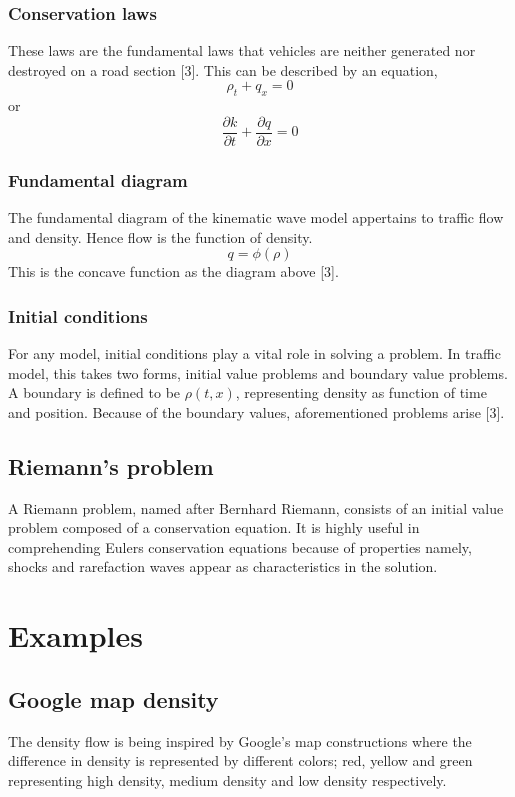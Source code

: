 \documentclass[12pt,a4paper]{report}
\begin{document}
	\subsubsection*{Conservation laws}
	These laws are the fundamental laws that vehicles are neither generated nor destroyed on a road section [3]. This can be described by an equation,
	$$\rho_t + q_x = 0$$ or
	$$\frac{\partial k}{\partial t} + \frac{\partial q}{\partial x} = 0$$
	\subsubsection*{Fundamental diagram}
	The fundamental diagram of the kinematic wave model appertains to traffic flow and density. Hence flow is the function of density.
	$$q = \phi (\rho)$$ This is the concave function as the diagram above [3].
	\subsubsection*{Initial conditions}
	For any model, initial conditions play a vital role in solving a problem. In traffic model, this takes two forms, initial value problems and boundary value problems. A boundary is defined to be $\rho (t, x)$, representing density as function of time and position. Because of the boundary values, aforementioned problems arise [3].
	\subsection*{Riemann's problem}
	A Riemann problem, named after Bernhard Riemann, consists of an initial value problem composed of a conservation equation. It is highly useful in comprehending Eulers conservation equations because of properties namely, shocks and rarefaction waves appear as characteristics in the solution.
	
	\section*{Examples}
	\subsection*{Google map density}
	The density flow is being inspired by Google's map constructions where the difference in density is represented by different colors; red, yellow and green representing high density, medium density and low density respectively.
\end{document}
